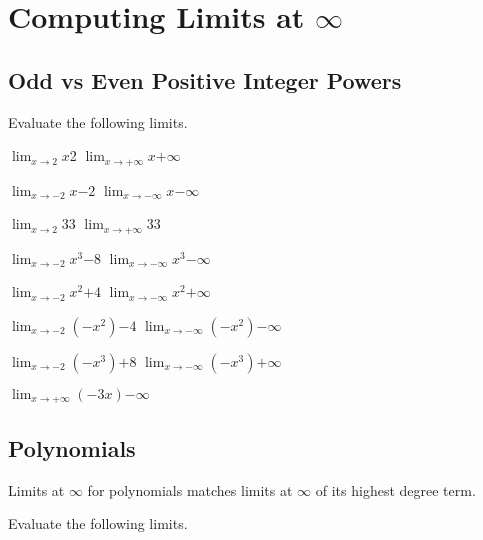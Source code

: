 
\section{Computing Limits at $\infty$}

\subsection{Odd vs Even Positive Integer Powers}

Evaluate the following limits.

\pairofprobsans
{$\displaystyle \lim_{x\rightarrow2} x$}{2}
{$\displaystyle \lim_{x\rightarrow+\infty} x$}{$+\infty$}

\pairofprobsans
{$\displaystyle  \lim_{x\rightarrow-2} x$}{$-2$}
{$\displaystyle \lim_{x\rightarrow-\infty} x$}{$-\infty$}

\pairofprobsans
{$\displaystyle  \lim_{x\rightarrow2} 3$}{$3$}
{$\displaystyle \lim_{x\rightarrow+\infty} 3$}{$3$}

\pairofprobsans
{$\displaystyle \lim_{x\rightarrow-2} x^3$}{$-8$}
{$\displaystyle \lim_{x\rightarrow-\infty} x^3$}{$-\infty$}

\pairofprobsans
{$\displaystyle \lim_{x\rightarrow-2} x^2$}{$+4$}
{$\displaystyle \lim_{x\rightarrow-\infty} x^2$}{$+\infty$}

\pairofprobsans
{$\displaystyle \lim_{x\rightarrow-2} (-x^2)$}{$-4$}
{$\displaystyle \lim_{x\rightarrow-\infty} (-x^2)$}{$-\infty$}

\pairofprobsans
{$\displaystyle \lim_{x\rightarrow-2} (-x^3)$}{$+8$}
{$\displaystyle \lim_{x\rightarrow-\infty} (-x^3)$}{$+\infty$}

\problemans
{$\displaystyle \lim_{x\rightarrow+\infty} (-3x)$}{$-\infty$}


\makenewpage\subsection{Polynomials}

\begin{myframe}[arc=10pt,auto outer arc]
	Limits at $\infty$ for polynomials matches limits at $\infty$ of its highest degree term.
\end{myframe}

\noindent Evaluate the following limits.

